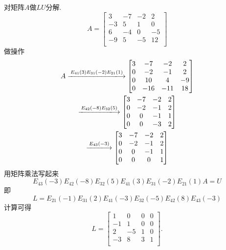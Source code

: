 \begin{example}
    对矩阵$A$做$LU$分解.
    \begin{equation}
      A = \begin{bmatrix}
       3 & -7 & -2 & 2\\
       -3 & 5 & 1 & 0\\
       6 & -4 & 0 & -5\\
       -9 & 5 & -5 & 12\\
      \end{bmatrix}
    \end{equation}
    做操作
    \begin{equation}
        \begin{gathered}
            A \xlongrightarrow{E_{41}(3)E_{31}(-2)E_{21}(1)} 
            \begin{bmatrix}
             3 & -7 & -2 & 2\\
             0 & -2 & -1 & 2\\
             0 & 10 & 4 & -9\\
             0 & -16 & -11 & 18\\
            \end{bmatrix}
            \\
            \xlongrightarrow{E_{42}(-8)E_{32}(5)}
            \begin{bmatrix}
             3 & -7 & -2 & 2\\
             0 & -2 & -1 & 2\\
             0 & 0 & -1 & 1\\
             0 & 0 & -3 & 2\\
            \end{bmatrix}
            \\
            \xlongrightarrow{E_{43}(-3)}
            \begin{bmatrix}
             3 & -7 & -2 & 2\\
             0 & -2 & -1 & 2\\
             0 & 0 & -1 & 1\\
             0 & 0 & 0 & 1\\
            \end{bmatrix}
        \end{gathered}
    \end{equation}
    用矩阵乘法写起来
    \begin{equation}
      E_{43}(-3)E_{42}(-8)E_{32}(5)E_{41}(3)E_{31}(-2)E_{21}(1)A = U
    \end{equation}
    即
    \begin{equation}
      L = E_{21}(-1) E_{31}(2)E_{41}(-3)E_{32}(-5)E_{42}(8)E_{43}(-3)
    \end{equation}
    计算可得
    \begin{equation}
      L = \begin{bmatrix}
       1 & 0 & 0 & 0\\
       -1 & 1 & 0 & 0\\
       2 & -5 & 1 & 0\\
       -3 & 8 & 3 & 1\\
      \end{bmatrix}.
    \end{equation}
\end{example}

